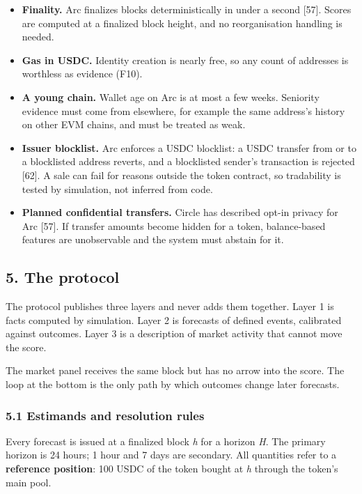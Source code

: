 \begin{itemize}
\tightlist
\item
  \textbf{Finality.} Arc finalizes blocks deterministically in under a second {[}57{]}. Scores are computed at a finalized block height, and no reorganisation handling is needed.
\item
  \textbf{Gas in USDC.} Identity creation is nearly free, so any count of addresses is worthless as evidence (F10).
\item
  \textbf{A young chain.} Wallet age on Arc is at most a few weeks. Seniority evidence must come from elsewhere, for example the same address's history on other EVM chains, and must be treated as weak.
\item
  \textbf{Issuer blocklist.} Arc enforces a USDC blocklist: a USDC transfer from or to a blocklisted address reverts, and a blocklisted sender's transaction is rejected {[}62{]}. A sale can fail for reasons outside the token contract, so tradability is tested by simulation, not inferred from code.
\item
  \textbf{Planned confidential transfers.} Circle has described opt-in privacy for Arc {[}57{]}. If transfer amounts become hidden for a token, balance-based features are unobservable and the system must abstain for it.
\end{itemize}

\subsection{5. The protocol}\label{the-protocol}

The protocol publishes three layers and never adds them together. Layer 1 is facts computed by simulation. Layer 2 is forecasts of defined events, calibrated against outcomes. Layer 3 is a description of market activity that cannot move the score.



The market panel receives the same block but has no arrow into the score. The loop at the bottom is the only path by which outcomes change later forecasts.

\subsubsection{5.1 Estimands and resolution rules}\label{estimands-and-resolution-rules}

Every forecast is issued at a finalized block \emph{h} for a horizon \emph{H}. The primary horizon is 24 hours; 1 hour and 7 days are secondary. All quantities refer to a \textbf{reference position}: 100 USDC of the token bought at \emph{h} through the token's main pool.

